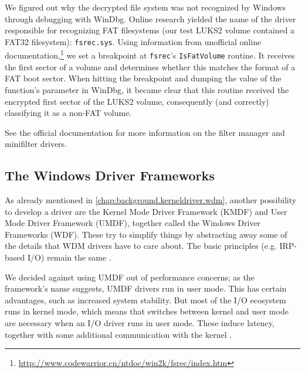 We figured out why the decrypted file system was not recognized by Windows through debugging with WinDbg. Online research yielded the name of the driver responsible for recognizing FAT filesystems (our test LUKS2 volume contained a FAT32 filesystem): \texttt{fsrec.sys}. Using information from unofficial online documentation,\footnote{\label{fn:ourapproach.rejected.fsrecdoc} \url{http://www.codewarrior.cn/ntdoc/win2k/fsrec/index.htm}} we set a breakpoint at \texttt{fsrec}'s \texttt{IsFatVolume} routine. It receives the first sector of a volume and determines whether this matches the format of a FAT boot sector. When hitting the breakpoint and dumping the value of the function's parameter in WinDbg, it became clear that this routine received the encrypted first sector of the LUKS2 volume, consequently (and correctly) classifying it as a non-FAT volume.

See the official documentation \cite{Fltmgr} for more information on the filter manager and minifilter drivers.


\subsection{The Windows Driver Frameworks}
\label{chap:ourapproach.rejected.wdf}
As already mentioned in \autoref{chap:background.kerneldriver.wdm}, another possibility to develop a driver are the Kernel Mode Driver Framework (KMDF) and User Mode Driver Framework (UMDF), together called the Windows Driver Frameworks (WDF). These try to simplify things by abstracting away some of the details that WDM drivers have to care about. The basic principles (e.g. IRP-based I/O) remain the same \cite{Yosifovich2017}.

We decided against using UMDF out of performance concerns; as the framework's name suggests, UMDF drivers run in user mode. This has certain advantages, such as increased system stability. But most of the I/O ecosystem runs in kernel mode, which means that switches between kernel and user mode are necessary when an I/O driver runs in user mode. These induce latency, together with some additional communication with the kernel \cite{Yosifovich2017}.

